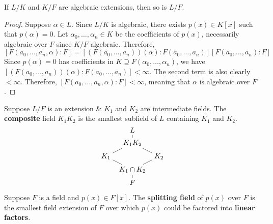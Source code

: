 \documentclass[12pt]{article}
\begin{document}
\begin{corollary}
    If $L/K$ and $K/F$ are algebraic extensions, then so is $L/F$.
\end{corollary}
\begin{proof}
    Suppose $\alpha\in L$. Since $L/K$ is algebraic, there exists $p(x)\in K[x]$ such that $p(\alpha)=0$. Let $\alpha_0,\dots,\alpha_n\in K$ be the coefficients of $p(x)$, necessarily algebraic over $F$ since $K/F$ algebraic. Therefore, $$[F(a_0,\dots,a_n,\alpha):F]=[(F(a_0,\dots,a_n))(\alpha):F(a_0,\dots,a_n)][F(a_0,\dots,a_n):F]$$
    Since $p(\alpha)=0$ has coefficients in $K\supseteq F(\alpha_0,\dots,\alpha_n)$, we have $[(F(a_0,\dots,a_n))(\alpha):F(a_0,\dots,a_n)]<\infty$. The second term is also clearly $<\infty$. Therefore, $[F(a_0,\dots,a_n,\alpha):F]<\infty$, meaning that $\alpha$ is algebraic over $F$.
\end{proof}

 Suppose $L/F$ is an extension \& $K_1$ and $K_2$ are intermediate fields. The \textbf{composite} field $K_1K_2$ is the smallest subfield of $L$ containing $K_1$ and $K_2$.
\[\begin{tikzcd}[ampersand replacement=\&,cramped,sep=tiny]
	\& L \\
	\& {K_1K_2} \\
	{K_1} \&\& {K_2} \\
	\& {K_1\cap K_2} \\
	\& F
	\arrow[no head, from=4-2, to=5-2]
	\arrow[no head, from=3-1, to=4-2]
	\arrow[no head, from=3-3, to=4-2]
	\arrow[no head, from=2-2, to=3-1]
	\arrow[no head, from=2-2, to=3-3]
	\arrow[no head, from=1-2, to=2-2]
\end{tikzcd}\]

 {}Suppose $F$ is a field and $p(x)\in F[x]$. The \textbf{splitting field} of $p(x)$ over $F$ is the smallest field extension of $F$ over which $p(x)$ could be factored into \textbf{linear factors}.
\end{document}
